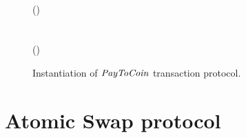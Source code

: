 \begin{figure}
\begin{center}
{\begin{varwidth}{\textwidth}
{                \varProofBob \opFunResult {} \\
                \varExcessAlice \opAssign \opAccess{\varTxAlice}{\varExcessAlice} \\
                \varRandAlice \opAssign \opAccess{\varTxAlice}{\varRandAlice} \\
                \varExcessBob \opFunResult {} \\
                \varRandBob \opFunResult \procSimpleCommit{\varNonceBob} \\
                \varSigBob \opFunResult {} \\
                \pcreturn \varTxBob \opAssign (\varCoinOutBob \opSeperate \varExcessBob \opSeperate \varRandBob \opSeperate \varSigBob)
            }
            \procedure[linenumbering, syntaxhighlight=auto]{$\procFinalizeTx{\varTxAlice}{\varTxBob}$} {
                  \\
                \varSigAlice \opFunResult {} \\
                \varSigFin \opFunResult \procFinSig{\varSigAlice}{\varSigBob}{\varRandAlice}{\varRandBob} \\
                \pcreturn (\varTxAlice \opSeperate \varTxBob \opSeperate \varSigFin)
            }
        \end{varwidth}
        }
    \end{center}
    \caption{Instantiation of $\mathit{PayToCoin}$ transaction protocol.}
    \label{fig:payToCoin}
\end{figure}

\section{Atomic Swap protocol}\label{sec:atomic-swap}